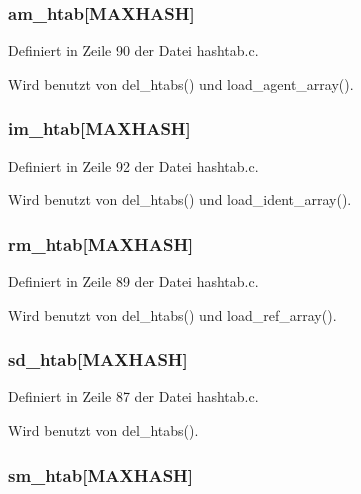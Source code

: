 \subsubsection{ {\bf am\_\-htab}[MAXHASH]}\label{hashtab_8c_4886dbd661ad553906dc83e1a8031316}




Definiert in Zeile 90 der Datei hashtab.c.

Wird benutzt von del\_\-htabs() und load\_\-agent\_\-array().
\subsubsection{ {\bf im\_\-htab}[MAXHASH]}\label{hashtab_8c_1a7bfe1ecf3b78722bcee9d08e8178a1}




Definiert in Zeile 92 der Datei hashtab.c.

Wird benutzt von del\_\-htabs() und load\_\-ident\_\-array().
\subsubsection{ {\bf rm\_\-htab}[MAXHASH]}\label{hashtab_8c_4b36877a2219872c641eb9a58ae45ce8}




Definiert in Zeile 89 der Datei hashtab.c.

Wird benutzt von del\_\-htabs() und load\_\-ref\_\-array().
\subsubsection{ {\bf sd\_\-htab}[MAXHASH]}\label{hashtab_8c_e5ddad8435a9d403e79f4bd320fea151}




Definiert in Zeile 87 der Datei hashtab.c.

Wird benutzt von del\_\-htabs().
\subsubsection{ {\bf sm\_\-htab}[MAXHASH]}\label{hashtab_8c_408742678920fdb90b2926c215e8e19c}




